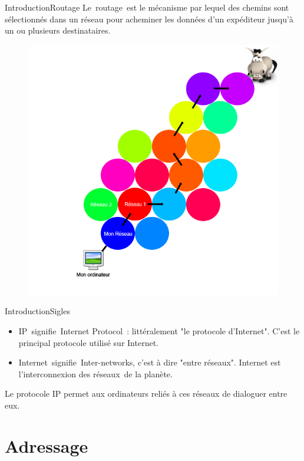 \documentclass{beamer}
\begin{document}
	\begin{frame}{Introduction}{Routage}
		Le routage est le mécanisme par lequel des chemins sont sélectionnés dans un réseau pour acheminer les données d'un expéditeur jusqu'à un ou plusieurs destinataires.\\
		\begin{figure}
			\includegraphics[scale = 0.3]{routage.png}
		\end{figure}
	\end{frame}

	\begin{frame}{Introduction}{Sigles}
		\begin{itemize}
			\item[\textbullet] IP signifie Internet Protocol : littéralement "le protocole d'Internet". C'est le principal protocole utilisé sur Internet.
			\item[\textbullet] Internet signifie Inter-networks, c'est à dire "entre réseaux". Internet est l'interconnexion des réseaux de la planète.
		\end{itemize}
			Le protocole IP permet aux ordinateurs reliés à ces réseaux de dialoguer entre eux.
	\end{frame}

\section{Adressage}
\end{document}

